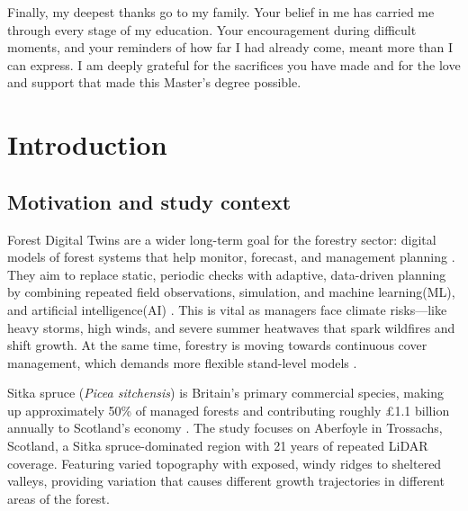 \documentclass[logo,msc,ai]{infthesis}           %
\begin{document}
\begin{preliminary}
\begin{acknowledgements}
Finally, my deepest thanks go to my family. Your belief in me has carried me through every stage of my education. Your encouragement during difficult moments, and your reminders of how far I had already come, meant more than I can express. I am deeply grateful for the sacrifices you have made and for the love and support that made this Master's degree possible.

\end{acknowledgements}


\tableofcontents
\end{preliminary}

\chapter{Introduction}  \label{ch:intro}

\section{Motivation and study context}
Forest Digital Twins are a wider long-term goal for the forestry sector: digital models of forest systems that help monitor, forecast, and  management planning \cite{baskent2026Review_C1_SS, buonocore2022Proposal_C1_SS}. They aim to replace static, periodic checks with adaptive, data-driven planning by combining repeated field observations, simulation, and machine learning(ML), and artificial intelligence(AI) \cite{baskent2026Review_C1_SS, buonocore2022Proposal_C1_SS}. This is vital as managers face climate risks—like heavy storms, high winds, and severe summer heatwaves that spark wildfires and shift growth. At the same time, forestry is moving towards continuous cover management, which demands more flexible stand-level models \cite{ForestResearch2009Evidence_C1_SS}.

Sitka spruce (\textit{Picea sitchensis}) is Britain's primary commercial species, making up approximately 50\% of managed forests \cite{ForestResearch2026Sitka_C1_SS} and contributing roughly \pounds1.1 billion annually to Scotland's economy \cite{ScottishForestry2026Future_C1_SS, mason2011Sitka_C1_SS}. The study focuses on Aberfoyle in Trossachs, Scotland, a Sitka spruce-dominated region with 21 years of repeated LiDAR coverage. Featuring varied topography with exposed, windy ridges to sheltered valleys, providing variation that causes different growth trajectories in different areas of the forest.
\end{document}
